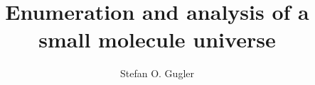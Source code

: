 \documentclass[]{article}
\title{Enumeration and analysis of a small molecule universe}
\author{Stefan O. Gugler}
\begin{document}
\maketitle

\begin{abstract}

\end{abstract}



\end{document}
